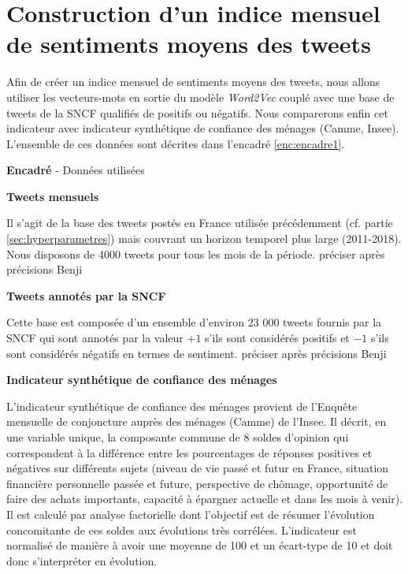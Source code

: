 \documentclass[11pt,french,french]{article}
\newcounter{comptEncadre}
\renewcommand\thecomptEncadre{%
\arabic{comptEncadre}}
\newenvironment{encadre}[2][false]{\refstepcounter{comptEncadre}
\begin{bclogo}[couleur=processblue!5,arrondi=0.1,
logo=\bcloupe,barre=none,couleurBord=blue!60!green,nobreak = #1]{ {\sc \textbf{Encadré \thecomptEncadre}} -  #2}
\smallskip
}{\end{bclogo}}
\begin{document}
\section{Construction d'un indice mensuel de sentiments moyens des
tweets}\label{sec:sentimentalAnalysis}

Afin de créer un indice mensuel de sentiments moyens des tweets, nous
allons utiliser les vecteurs-mots en sortie du modèle \emph{Word2Vec}
couplé avec une base de tweets de la SNCF qualifiés de positifs ou
négatifs. Nous comparerons enfin cet indicateur avec indicateur
synthétique de confiance des ménages (Camme, Insee). L'ensemble de ces
données sont décrites dans l'encadré \ref{enc:encadre1}.

\begin{encadre}[true]{Données utilisées}\label{enc:encadre1}

\small

\textbf{Tweets mensuels}

Il s'agit de la base des tweets postés en France utilisée précédemment (cf. partie  \ref{sec:hyperparametres}) mais couvrant un horizon temporel plus large (2011-2018).
Nous disposons de 4000 tweets pour tous les mois de la période. \colorbox{BurntOrange}{préciser après précisions Benji} 

\textbf{Tweets annotés par la SNCF}

Cette base est composée d'un ensemble d'environ 23 000 tweets fournis par la SNCF qui sont annotés par la valeur $+1$ s'ils sont considérés positifs et $-1$ s'ils sont considérés négatifs en termes de sentiment. \colorbox{BurntOrange}{préciser après précisions Benji} 


\textbf{Indicateur synthétique de confiance des ménages}

L’indicateur synthétique de confiance des ménages provient de l'Enquête mensuelle de conjoncture auprès des ménages (Camme) de l’Insee.
Il décrit, en une variable unique, la composante commune de 8 soldes d’opinion qui correspondent à la différence entre les pourcentages de réponses positives et négatives sur différents sujets (niveau de vie passé et futur en France, situation financière personnelle passée et future, perspective de chômage, opportunité de faire des achats importants, capacité à épargner actuelle et dans les mois à venir).
Il est calculé par analyse factorielle dont l’objectif est de résumer l’évolution concomitante de ces soldes aux évolutions très corrélées.
L’indicateur est normalisé de manière à avoir une moyenne de 100 et un écart-type de 10 et doit donc s’interpréter en évolution. 

\end{encadre}
\end{document}
